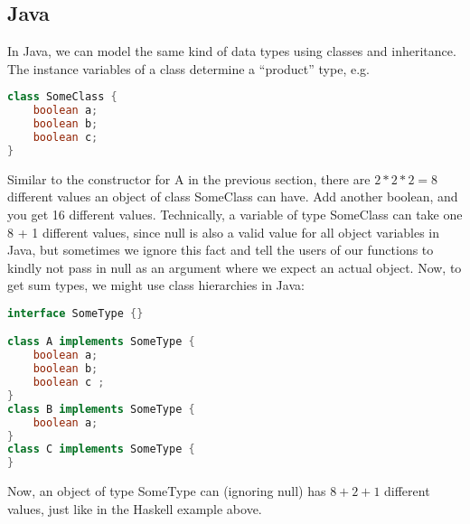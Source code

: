             \subsection*{Java}
            In Java, we can model the same kind of data types using classes and inheritance. The instance
            variables of a class determine a “product” type, e.g.

            \begin{lstlisting}[language=Java]
class SomeClass {
    boolean a;
    boolean b;
    boolean c;
}
            \end{lstlisting}
    Similar to the constructor for A in the previous section, there are $2 * 2 * 2 = 8$ different
    values an object of class SomeClass can have. Add another boolean, and you get 16 different
    values. Technically, a variable of type SomeClass can take one 8 + 1 different values, since
    null is also a valid value for all object variables in Java, but sometimes we ignore this fact
    and tell the users of our functions to kindly not pass in null as an argument where we expect
    an actual object.
    Now, to get sum types, we might use class hierarchies in Java:
    
    \newpage
    \begin{lstlisting}[language=Java]
interface SomeType {}

class A implements SomeType {
    boolean a;
    boolean b;
    boolean c ;
}
class B implements SomeType {
    boolean a;
}
class C implements SomeType {
}
    \end{lstlisting}
    Now, an object of type SomeType can (ignoring null) has $8 + 2 + 1$ different values,
    just like in the Haskell example above.

